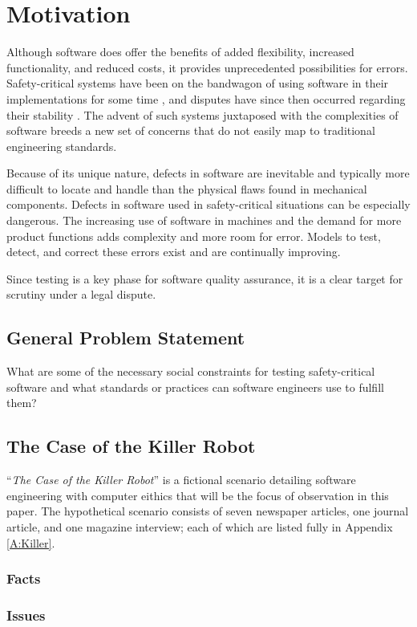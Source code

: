 \chapter{Motivation}\label{C:Motivation}

Although software does offer the benefits of added flexibility, increased
functionality, and reduced costs, it provides unprecedented possibilities for
errors. Safety-critical systems have been on the bandwagon of using software in
their implementations for some time \cite{Graupe78,Hurtig94}, and disputes have
since then occurred regarding their stability \cite{Leveson93,Maisel05}. The 
advent of such systems juxtaposed with the complexities of software breeds a new
set of concerns that do not easily map to traditional engineering standards.

Because of its unique nature, defects in software are inevitable and typically
more difficult to locate and handle than the physical flaws found in mechanical
components. Defects in software used in safety-critical situations can be
especially dangerous. The increasing use of software in machines and the demand
for more product functions adds complexity and more room for error. Models to
test, detect, and correct these errors exist and are continually improving.

Since testing is a key phase for software quality assurance, it is a clear
target for scrutiny under a legal dispute.

\section{General Problem Statement}
What are some of the necessary social constraints for testing safety-critical
software and what standards or practices can software engineers use to fulfill
them?

\section{The Case of the Killer Robot}
``\textit{The Case of the Killer Robot}'' \cite{Epstein96} is a fictional  
scenario detailing software engineering with computer eithics that will be the
focus of observation in this paper. The hypothetical scenario consists of seven
newspaper articles, one journal article, and one magazine interview; each of
which are listed fully in Appendix \ref{A:Killer}.

\subsection{Facts}

\subsection{Issues}
